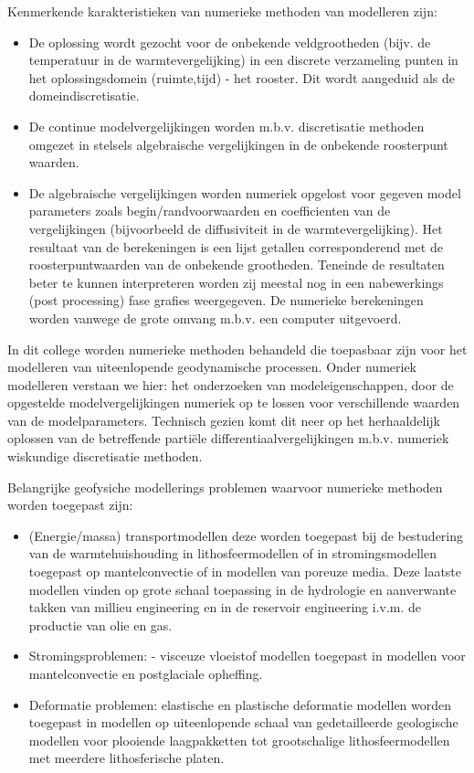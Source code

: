 \noindent
Kenmerkende karakteristieken van numerieke methoden van modelleren zijn:
\begin{itemize}
\item
De oplossing wordt gezocht voor de onbekende veldgrootheden
(bijv. de temperatuur in de warmtevergelijking) in een discrete
verzameling punten in het oplossingsdomein (ruimte,tijd) - het rooster.
Dit wordt aangeduid als de domeindiscretisatie.
\item
De continue modelvergelijkingen worden m.b.v. discretisatie methoden
omgezet in stelsels algebraische vergelijkingen in de
onbekende roosterpunt waarden.
\item
De algebraische vergelijkingen worden numeriek opgelost voor gegeven
model parameters zoals begin/randvoorwaarden en coefficienten van
de vergelijkingen (bijvoorbeeld de diffusiviteit in de 
warmtevergelijking).
Het resultaat van de berekeningen is een lijst getallen corresponderend
met de roosterpuntwaarden van de onbekende grootheden.
Teneinde de resultaten beter te kunnen interpreteren worden zij
meestal nog in een nabewerkings (post processing) fase grafies 
weergegeven.
De numerieke berekeningen worden vanwege de grote omvang m.b.v. een
computer uitgevoerd.
\end{itemize}
\vspace{0.5cm}
\noindent
In dit college worden numerieke methoden behandeld die toepasbaar
zijn voor het modelleren van uiteenlopende geodynamische  processen.
Onder numeriek modelleren verstaan we hier:
het onderzoeken van modeleigenschappen, door de opgestelde 
modelvergelijkingen numeriek op te lossen voor verschillende waarden
van de modelparameters.
Technisch gezien komt dit neer op het herhaaldelijk oplossen van de
betreffende parti\"{e}le differentiaalvergelijkingen m.b.v.
numeriek wiskundige discretisatie methoden.

\noindent
Belangrijke geofysiche modellerings problemen waarvoor numerieke 
methoden worden toegepast zijn:
\begin{itemize}
\item (Energie/massa) transportmodellen
deze worden toegepast bij de bestudering van de warmtehuishouding in 
lithosfeermodellen of in stromingsmodellen toegepast op mantelconvectie
of in modellen van poreuze media.
Deze laatste modellen vinden op grote schaal toepassing in de
hydrologie en aanverwante takken van millieu engineering en
in de reservoir engineering i.v.m. de productie van olie en gas.
\item Stromingsproblemen: - visceuze vloeistof modellen toegepast
in modellen voor mantelconvectie en postglaciale opheffing.
\item Deformatie problemen: elastische en plastische deformatie 
modellen worden toegepast in modellen op uiteenlopende schaal van
gedetailleerde geologische modellen voor plooiende laagpakketten
tot grootschalige lithosfeermodellen met meerdere lithosferische
platen.
\end{itemize}

